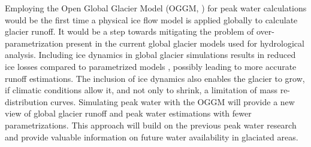 \documentclass[12pt, a4paper]{article}
\begin{document}
Employing the Open Global Glacier Model (OGGM,
\cite{maussionOpenGlobalGlacier2019}) for peak water calculations would be the
first time a physical ice flow model is applied globally to calculate glacier
runoff. It would be a step towards mitigating the problem of
over-parametrization present in the current global glacier models used for
hydrological analysis. Including ice dynamics in global glacier simulations
results in reduced ice losses compared to parametrized models
\parencite{zekollariModellingFutureEvolution2019}, possibly leading to more
accurate runoff estimations. The inclusion of ice dynamics also enables the
glacier to grow, if climatic conditions allow it, and not only to shrink, a
limitation of mass re-distribution curves. Simulating peak water with the OGGM
will provide a new view of global glacier runoff and peak water estimations with
fewer parametrizations. This approach will build on the previous peak water
research and provide valuable information on future water availability in
glaciated areas. 

\end{document}
